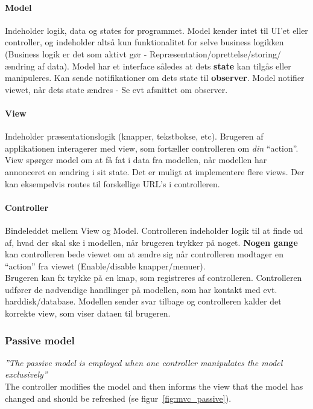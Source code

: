 \paragraph{Model} Indeholder logik, data og states for programmet. Model kender intet til UI’et eller controller, og indeholder altså kun funktionalitet for selve business logikken (Business logik er det som aktivt gør - Repræsentation/oprettelse/storing/ændring af data). Model har et interface således at dets \textbf{state} kan tilgås eller manipuleres. Kan sende notifikationer om dets state til \textbf{observer}. Model notifier viewet, når dets state ændres - Se evt afsnittet om observer.

\paragraph{View} Indeholder præsentationslogik (knapper, tekstbokse, etc). Brugeren af applikationen interagerer med view, som fortæller controlleren om \textit{din} “action”. View spørger model om at få fat i data fra modellen, når modellen har annonceret en ændring i sit state. Det er muligt at implementere flere views. Der kan eksempelvis routes til forskellige URL's i controlleren.

\paragraph{Controller} Bindeleddet mellem View og Model. Controlleren indeholder logik til at finde ud af, hvad der skal ske i modellen, når brugeren trykker på noget. \textbf{Nogen gange} kan controlleren bede viewet om at ændre sig når controlleren modtager en “action” fra viewet (Enable/disable knapper/menuer).\\	

Brugeren kan fx trykke på en knap, som registreres af controlleren. Controlleren udfører de nødvendige handlinger på modellen, som har kontakt med evt. harddisk/database. Modellen sender svar tilbage og controlleren kalder det korrekte view, som viser dataen til brugeren.

\subsubsection{Passive model}
\textit{''The passive model is employed when one controller manipulates the model exclusively''}\\

The controller modifies the model and then informs the view that the model has changed and should be refreshed (se figur~\ref{fig:mvc_passive}).

